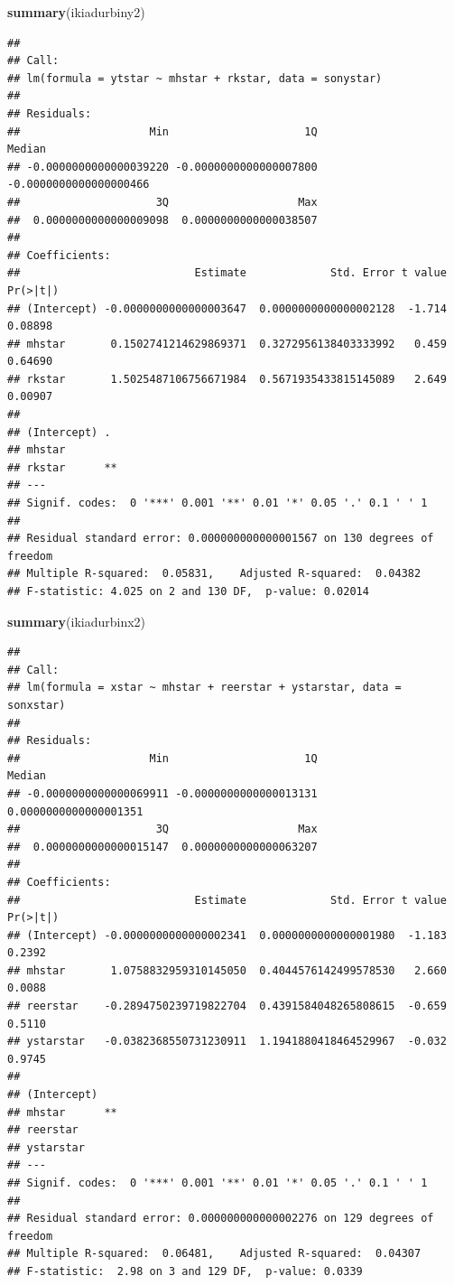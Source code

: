 \documentclass[]{article}
\newenvironment{Shaded}{\begin{snugshade}}{\end{snugshade}}
\newcommand{\KeywordTok}[1]{\textcolor[rgb]{0.13,0.29,0.53}{\textbf{#1}}}
\newcommand{\NormalTok}[1]{#1}
\begin{document}
\begin{Shaded}
\begin{Highlighting}[]
\KeywordTok{summary}\NormalTok{(ikiadurbiny2)}
\end{Highlighting}
\end{Shaded}

\begin{verbatim}
## 
## Call:
## lm(formula = ytstar ~ mhstar + rkstar, data = sonystar)
## 
## Residuals:
##                    Min                     1Q                 Median 
## -0.0000000000000039220 -0.0000000000000007800 -0.0000000000000000466 
##                     3Q                    Max 
##  0.0000000000000009098  0.0000000000000038507 
## 
## Coefficients:
##                           Estimate             Std. Error t value Pr(>|t|)
## (Intercept) -0.0000000000000003647  0.0000000000000002128  -1.714  0.08898
## mhstar       0.1502741214629869371  0.3272956138403333992   0.459  0.64690
## rkstar       1.5025487106756671984  0.5671935433815145089   2.649  0.00907
##               
## (Intercept) . 
## mhstar        
## rkstar      **
## ---
## Signif. codes:  0 '***' 0.001 '**' 0.01 '*' 0.05 '.' 0.1 ' ' 1
## 
## Residual standard error: 0.000000000000001567 on 130 degrees of freedom
## Multiple R-squared:  0.05831,    Adjusted R-squared:  0.04382 
## F-statistic: 4.025 on 2 and 130 DF,  p-value: 0.02014
\end{verbatim}

\begin{Shaded}
\begin{Highlighting}[]
\KeywordTok{summary}\NormalTok{(ikiadurbinx2)}
\end{Highlighting}
\end{Shaded}

\begin{verbatim}
## 
## Call:
## lm(formula = xstar ~ mhstar + reerstar + ystarstar, data = sonxstar)
## 
## Residuals:
##                    Min                     1Q                 Median 
## -0.0000000000000069911 -0.0000000000000013131  0.0000000000000001351 
##                     3Q                    Max 
##  0.0000000000000015147  0.0000000000000063207 
## 
## Coefficients:
##                           Estimate             Std. Error t value Pr(>|t|)
## (Intercept) -0.0000000000000002341  0.0000000000000001980  -1.183   0.2392
## mhstar       1.0758832959310145050  0.4044576142499578530   2.660   0.0088
## reerstar    -0.2894750239719822704  0.4391584048265808615  -0.659   0.5110
## ystarstar   -0.0382368550731230911  1.1941880418464529967  -0.032   0.9745
##               
## (Intercept)   
## mhstar      **
## reerstar      
## ystarstar     
## ---
## Signif. codes:  0 '***' 0.001 '**' 0.01 '*' 0.05 '.' 0.1 ' ' 1
## 
## Residual standard error: 0.000000000000002276 on 129 degrees of freedom
## Multiple R-squared:  0.06481,    Adjusted R-squared:  0.04307 
## F-statistic:  2.98 on 3 and 129 DF,  p-value: 0.0339
\end{verbatim}
\end{document}
